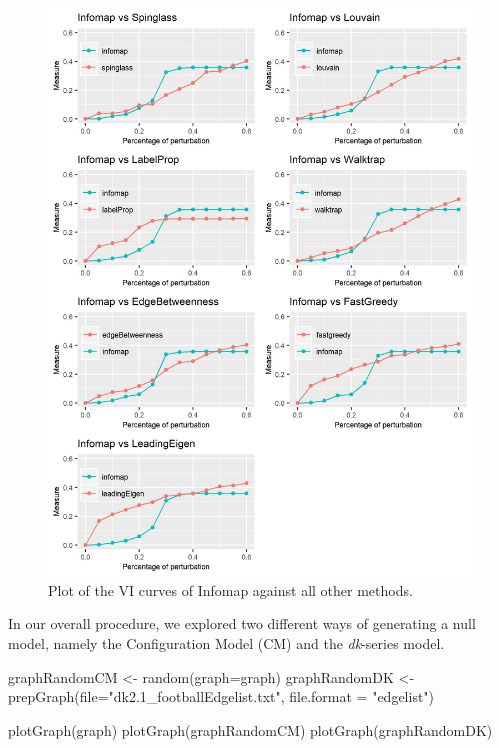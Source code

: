 \begin{figure}[h]
\centering
\includegraphics[width=14cm]{PlotComparisonAllVsInfomap.png}
\caption{Plot of the VI curves of Infomap against all other methods.}
\label{fig:PlotComparison_allInfomap}
\end{figure}



In our overall procedure, we explored two different ways of generating a null model, namely the Configuration Model (CM) and the {\it dk}-series model.

\begin{example}

graphRandomCM <- random(graph=graph)
graphRandomDK <- prepGraph(file="dk2.1_footballEdgelist.txt",
                          file.format = "edgelist")
                             
plotGraph(graph)
plotGraph(graphRandomCM)
plotGraph(graphRandomDK)

\end{example}

